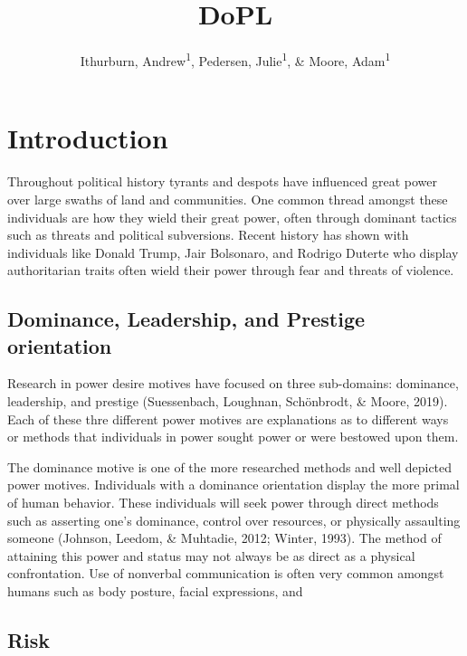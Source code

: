 \documentclass[
  english,
  man]{apa6}
\title{DoPL}
\author{Ithurburn, Andrew\textsuperscript{1}, Pedersen, Julie\textsuperscript{1}, \& Moore, Adam\textsuperscript{1}}
\date{}
\affiliation{\vspace{0.5cm}\textsuperscript{1} The University of Edinburgh}
\begin{document}
\maketitle

\hypertarget{introduction}{%
\section{Introduction}\label{introduction}}

Throughout political history tyrants and despots have influenced great power over large swaths of land and communities. One common thread amongst these individuals are how they wield their great power, often through dominant tactics such as threats and political subversions. Recent history has shown with individuals like Donald Trump, Jair Bolsonaro, and Rodrigo Duterte who display authoritarian traits often wield their power through fear and threats of violence.

\hypertarget{dominance-leadership-and-prestige-orientation}{%
\subsection{Dominance, Leadership, and Prestige orientation}\label{dominance-leadership-and-prestige-orientation}}

Research in power desire motives have focused on three sub-domains: dominance, leadership, and prestige (Suessenbach, Loughnan, Schönbrodt, \& Moore, 2019). Each of these thre different power motives are explanations as to different ways or methods that individuals in power sought power or were bestowed upon them.

The dominance motive is one of the more researched methods and well depicted power motives. Individuals with a dominance orientation display the more primal of human behavior. These individuals will seek power through direct methods such as asserting one's dominance, control over resources, or physically assaulting someone (Johnson, Leedom, \& Muhtadie, 2012; Winter, 1993). The method of attaining this power and status may not always be as direct as a physical confrontation. Use of nonverbal communication is often very common amongst humans such as body posture, facial expressions, and

\hypertarget{risk}{%
\subsection{Risk}\label{risk}}
\end{document}
